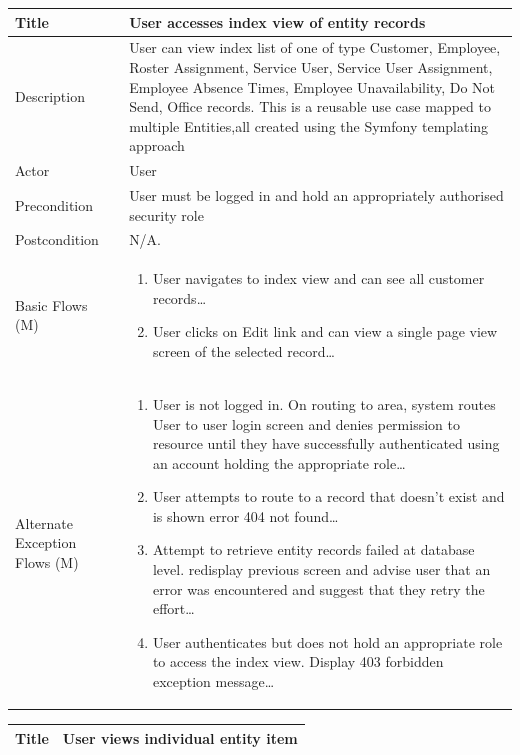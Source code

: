 \documentclass[a4paper,12pt]{article}
\newcommand\addrow[2]{#1 &#2\\ }
\newcommand\addheading[2]{#1 &#2\\ \hline}
\newcommand\tabularhead{\begin{tabular}{lp{8cm}}
\hline
}
\newcommand\addmulrow[2]{ \begin{minipage}[t][][t]{2.5cm}#1\end{minipage}%
   &\begin{minipage}[t][][t]{8cm}
    \begin{enumerate} #2   \end{enumerate}
    \end{minipage}\\ }
\newenvironment{usecase}{\tabularhead}
{\hline\end{tabular}}
\begin{document}
\begin{samepage}
\begin{usecase}
\end{usecase}

\begin{usecase}

    \addheading{Title}{User accesses index view of entity records }
  \addheading{Description}{User can view index list of one of type Customer, Employee, Roster Assignment, Service User, Service User Assignment, Employee Absence Times, Employee Unavailability, Do Not Send, Office records. This is a reusable use case mapped to multiple Entities,all created using the Symfony templating approach}
  \addheading{Actor}{User} 
  \addrow{Precondition}{User must be logged in and hold an appropriately authorised security role}
  \addrow{Postcondition}{N/A.}
  \addmulrow{Basic Flows (M)}{\item User navigates to index view and can see all customer records\ldots
                                  \item User clicks on Edit link and can view a single page view screen of the selected record\ldots}
  \addmulrow{Alternate Exception Flows (M)}{\item User is not logged in. On routing to area, system routes User to user login screen and denies permission to resource until they have successfully authenticated using an account holding the appropriate  role\ldots
                                   \item User attempts to route to a record that doesn't exist and is shown error 404 not found\ldots
                                   \item Attempt to retrieve entity records failed at database level. redisplay previous screen and advise user that an error was encountered and suggest that they retry the effort\ldots
                                   \item User authenticates but does not hold an appropriate role to access the index view. Display 403 forbidden exception message\ldots}

\end{usecase}

\begin{usecase}
    \addheading{Title}{User views individual entity item}


\end{usecase}
\end{samepage}
\end{document}
